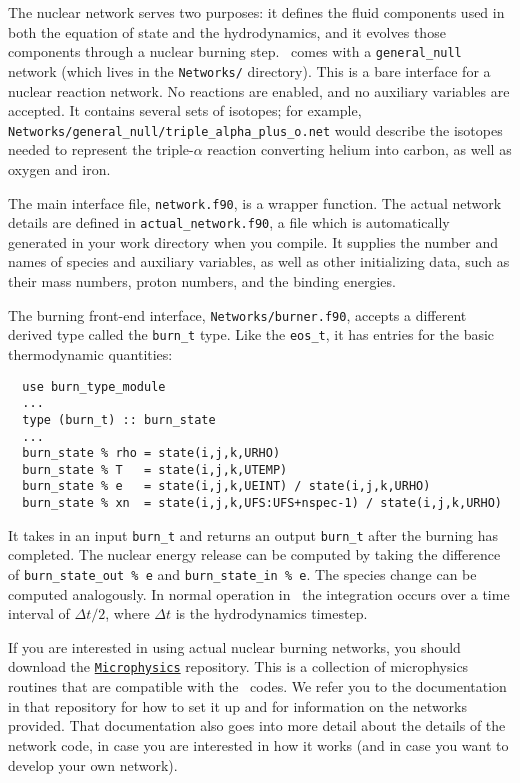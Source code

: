 The nuclear network serves two purposes: it defines the fluid components used
in both the equation of state and the hydrodynamics, and it evolves those
components through a nuclear burning step. \castro\ comes with a {\tt general\_null}
network (which lives in the {\tt Networks/} directory). This is a bare interface for a
nuclear reaction network. No reactions are enabled, and no auxiliary variables
are accepted. It contains several sets of isotopes; for example,
{\tt Networks/general\_null/triple\_alpha\_plus\_o.net} would describe the
isotopes needed to represent the triple-$\alpha$ reaction converting
helium into carbon, as well as oxygen and iron.

The main interface file, {\tt network.f90}, is a wrapper function. The
actual network details are defined in {\tt actual\_network.f90}, a 
file which is automatically generated in your work directory when you compile.
It supplies the number and names of species and auxiliary variables, as
well as other initializing data, such as their mass numbers, proton numbers, 
and the binding energies.

The burning front-end interface, {\tt Networks/burner.f90}, accepts a different 
derived type called the {\tt burn\_t} type. Like the {\tt eos\_t}, it has entries 
for the basic thermodynamic quantities:
\begin{verbatim}
  use burn_type_module
  ...
  type (burn_t) :: burn_state
  ...
  burn_state % rho = state(i,j,k,URHO)
  burn_state % T   = state(i,j,k,UTEMP)
  burn_state % e   = state(i,j,k,UEINT) / state(i,j,k,URHO)
  burn_state % xn  = state(i,j,k,UFS:UFS+nspec-1) / state(i,j,k,URHO)
\end{verbatim}
It takes in an input {\tt burn\_t} and returns an output {\tt burn\_t} after 
the burning has completed. The nuclear energy release can be computed by 
taking the difference of {\tt burn\_state\_out \% e} and 
{\tt burn\_state\_in \% e}. The species change can be computed analogously. 
In normal operation in \castro\, the integration occurs over a time interval 
of $\Delta t/2$, where $\Delta t$ is the hydrodynamics timestep.

If you are interested in using actual nuclear burning networks,
you should download the \href{https://github.com/starkiller-astro/Microphysics}{\tt Microphysics}
repository. This is a collection of microphysics routines that are compatible with the
\boxlib\ codes. We refer you to the documentation in that repository for how to set it up
and for information on the networks provided. That documentation
also goes into more detail about the details of the network code, in case you are interested in
how it works (and in case you want to develop your own network).


